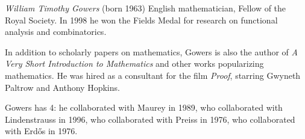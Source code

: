 \documentclass[12pt]{article}
\begin{document}
\emph{William Timothy Gowers} (born 1963) English mathematician, Fellow of the Royal Society. In 1998 he won the Fields Medal for research on functional analysis and combinatorics.

In addition to scholarly papers on mathematics, Gowers is also the author of {\it A Very Short Introduction to Mathematics} and other works popularizing mathematics. He was hired as a consultant for the film {\it Proof}, starring Gwyneth Paltrow and Anthony Hopkins.

Gowers has  4: he collaborated with Maurey in 1989, who collaborated with Lindenstrauss in 1996, who collaborated with Preiss in 1976, who collaborated with Erd\H{o}s in 1976.
\end{document}
